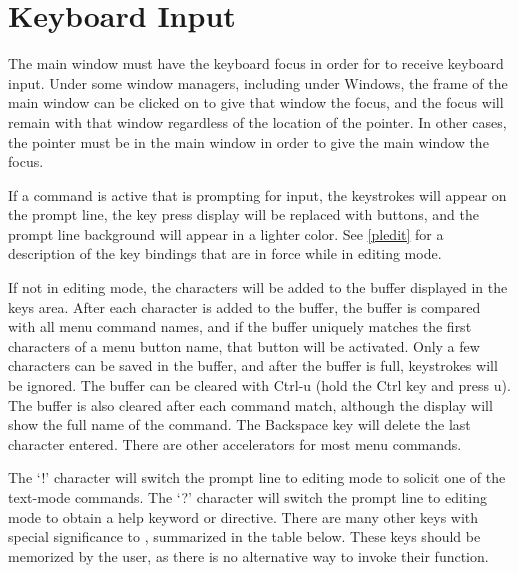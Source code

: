 \section{Keyboard Input}

The main window must have the keyboard focus in order for {\Xic} to
receive keyboard input.  Under some window managers, including under
Windows, the frame of the main window can be clicked on to give that
window the focus, and the focus will remain with that window regardless
of the location of the pointer.  In other cases, the pointer must be
in the main window in order to give the main window the focus.

If a command is active that is prompting for input, the keystrokes
will appear on the prompt line, the key press display will be replaced
with buttons, and the prompt line background will appear in a lighter
color.  See \ref{pledit} for a description of the key bindings that are
in force while in editing mode.

If not in editing mode, the characters will be added to the buffer
displayed in the keys area.  After each character is added to the
buffer, the buffer is compared with all menu command names, and if the
buffer uniquely matches the first characters of a menu button name,
that button will be activated.  Only a few characters can be saved in
the buffer, and after the buffer is full, keystrokes will be ignored. 
The buffer can be cleared with {\kb Ctrl-u} (hold the {\kb Ctrl} key
and press {\kb u}).  The buffer is also cleared after each command
match, although the display will show the full name of the command. 
The {\kb Backspace} key will delete the last character entered.  There
are other accelerators for most menu commands.

The `!' character will switch the prompt line to editing mode to
solicit one of the text-mode commands.  The `?' character will switch
the prompt line to editing mode to obtain a help keyword or directive. 
There are many other keys with special significance to {\Xic},
summarized in the table below.  These keys should be memorized by the
user, as there is no alternative way to invoke their function.


